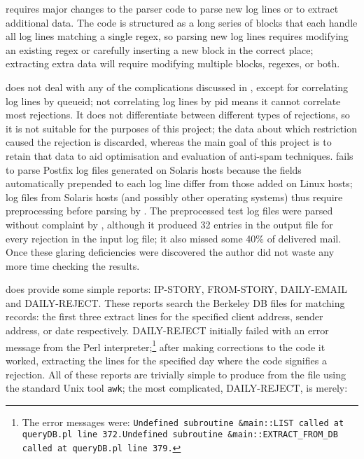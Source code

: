  requires major changes to the parser code to parse new log lines
or to extract additional data.  The code is structured as a long series of
blocks that each handle all log lines matching a single regex, so parsing
new log lines requires modifying an existing regex or carefully inserting a
new block in the correct place; extracting extra data will require
modifying multiple blocks, regexes, or both.

 does not deal with any of the complications discussed in
, except for correlating log lines by queueid;
not correlating log lines by pid means it cannot correlate most rejections.
It does not differentiate between different types of rejections, so it is
not suitable for the purposes of this project; the data about which
restriction caused the rejection is discarded, whereas the main goal of
this project is to retain that data to aid optimisation and evaluation of
anti-spam techniques.   fails to parse Postfix log files
generated on Solaris hosts because the fields automatically prepended to
each log line differ from those added on Linux hosts; log files from
Solaris hosts (and possibly other operating systems) thus require
preprocessing before parsing by .  The \numberOFlogFILES{}
preprocessed test log files were parsed without complaint by ,
although it produced 32 entries in the output  file for every
rejection in the input log file; it also missed some 40\% of delivered
mail.  Once these glaring deficiencies were discovered the author did not
waste any more time checking the results.

 does provide some simple reports: IP-STORY, FROM-STORY,
DAILY-EMAIL and DAILY-REJECT\@.  These reports search the Berkeley DB files
for matching records: the first three extract  lines for the
specified client  address, sender address, or date
respectively.  DAILY-REJECT initially failed with an error message from the
Perl interpreter;\footnote{The error messages were:
\newline{}\texttt{Undefined subroutine \&main::LIST called at queryDB.pl
line 372.}\newline{}\texttt{Undefined subroutine \&main::EXTRACT\_FROM\_DB
called at queryDB.pl line 379.}} after making corrections to the code it
worked, extracting the  lines for the specified day where the
 code signifies a rejection.  All of these reports are
trivially simple to produce from the  file using the standard
Unix tool \texttt{awk}; the most complicated, DAILY-REJECT, is
merely:

